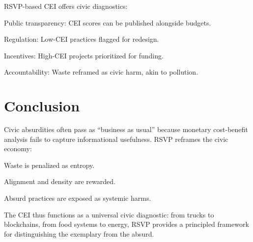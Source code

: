 \documentclass{book}
\begin{document}
RSVP-based CEI offers civic diagnostics:

Public transparency: CEI scores can be published alongside budgets.

Regulation: Low-CEI practices flagged for redesign.

Incentives: High-CEI projects prioritized for funding.

Accountability: Waste reframed as civic harm, akin to pollution.

\section{Conclusion}

Civic absurdities often pass as “business as usual” because monetary cost-benefit analysis fails to capture informational usefulness. RSVP reframes the civic economy:

Waste is penalized as entropy.

Alignment and density are rewarded.

Absurd practices are exposed as systemic harms.

The CEI thus functions as a universal civic diagnostic: from trucks to blockchains, from food systems to energy, RSVP provides a principled framework for distinguishing the exemplary from the absurd.

\newpage


\end{document}
